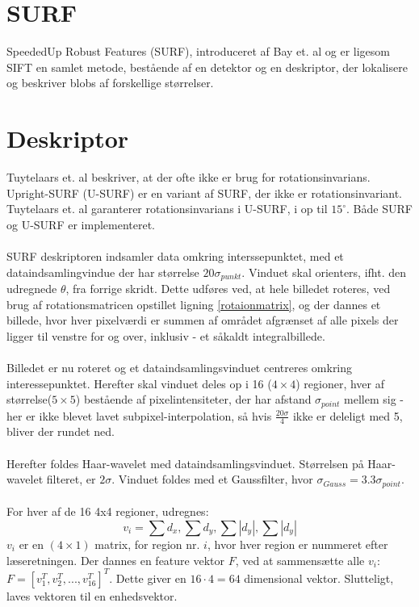 \section{SURF}
SpeededUp Robust Features (SURF), introduceret af Bay et. al \cite{SURF} og er ligesom SIFT en samlet metode, bestående af en detektor og en deskriptor, der lokalisere og beskriver blobs af forskellige størrelser.



\section{Deskriptor}
Tuytelaars et. al \cite{SURF} beskriver, at der ofte ikke er brug for rotationsinvarians. Upright-SURF (U-SURF) er en variant af SURF, der ikke er rotationsinvariant. Tuytelaars et. al garanterer rotationsinvarians i U-SURF, i op til $15^{\circ}$. Både SURF og U-SURF er implementeret.
\\
\\
SURF deskriptoren indsamler data omkring interssepunktet, med et dataindsamlingvindue der har størrelse $20 \sigma_{punkt}$. Vinduet skal orienters, ifht. den udregnede $\theta$, fra forrige skridt. Dette udføres ved, at hele billedet roteres, ved brug af rotationsmatricen opstillet ligning \eqref{rotaionmatrix}, og der dannes et billede, hvor hver pixelværdi er summen af området afgrænset af alle pixels der ligger til venstre for og over, inklusiv - et såkaldt integralbillede. 
\\
\\
Billedet er nu roteret og et dataindsamlingsvinduet centreres omkring interessepunktet. Herefter skal vinduet deles op i 16 ($4 \times 4$) regioner, hver af størrelse($5\times 5$) bestående af pixelintensiteter, der har afstand $\sigma_{point}$ mellem sig - her er ikke blevet lavet subpixel-interpolation, så hvis $\frac{20\sigma}{4}$ ikke er deleligt med 5, bliver der rundet ned.
\\
\\
Herefter foldes Haar-wavelet med dataindsamlingsvinduet. Størrelsen på Haar-wavelet filteret, er $2\sigma$. Vinduet foldes med et Gaussfilter, hvor $\sigma_{Gauss} = 3.3\sigma_{point}$.
\\
\\
For hver af de 16 4x4 regioner, udregnes: 
\begin{equation}
v_i = \sum d_x, \sum d_y, \sum |d_y|, \sum |d_y|
\label{surffeature}
\end{equation}
$v_i$ er en $(4\times 1)$ matrix, for region nr. $i$, hvor hver region er nummeret efter læseretningen. Der dannes en feature vektor $F$, ved at sammensætte alle $v_i$: $F = [v_1^T, v_2^T,..., v_{16}^T]^T$. Dette giver en $16 \cdot 4 = 64$ dimensional vektor. Slutteligt, laves vektoren til en enhedsvektor.
